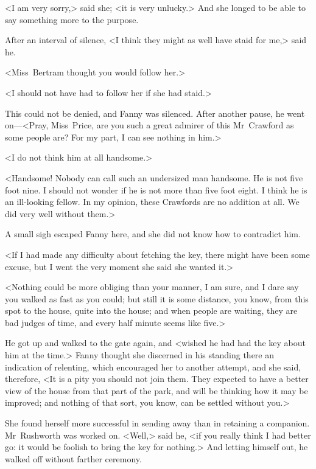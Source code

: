 <I am very sorry,> said she; <it is very unlucky.> And she longed to be able to say something more to the purpose.

After an interval of silence, <I think they might as well have staid for me,> said he.

<Miss~Bertram thought you would follow her.>

<I should not have had to follow her if she had staid.>

This could not be denied, and Fanny was silenced. After another pause, he went on—<Pray, Miss~Price, are you such a great admirer of this Mr~Crawford as some people are? For my part, I can see nothing in him.>

<I do not think him at all handsome.>

<Handsome! Nobody can call such an undersized man handsome. He is not five foot nine. I should not wonder if he is not more than five foot eight. I think he is an ill-looking fellow. In my opinion, these Crawfords are no addition at all. We did very well without them.>

A small sigh escaped Fanny here, and she did not know how to contradict him.

<If I had made any difficulty about fetching the key, there might have been some excuse, but I went the very moment she said she wanted it.>

<Nothing could be more obliging than your manner, I am sure, and I dare say you walked as fast as you could; but still it is some distance, you know, from this spot to the house, quite into the house; and when people are waiting, they are bad judges of time, and every half minute seems like five.>

He got up and walked to the gate again, and <wished he had had the key about him at the time.> Fanny thought she discerned in his standing there an indication of relenting, which encouraged her to another attempt, and she said, therefore, <It is a pity you should not join them. They expected to have a better view of the house from that part of the park, and will be thinking how it may be improved; and nothing of that sort, you know, can be settled without you.>

She found herself more successful in sending away than in retaining a companion. Mr~Rushworth was worked on. <Well,> said he, <if you really think I had better go: it would be foolish to bring the key for nothing.> And letting himself out, he walked off without farther ceremony.

